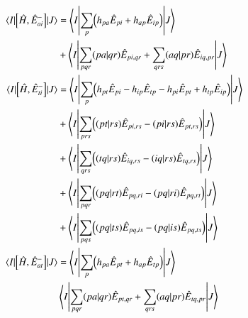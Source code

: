 \documentclass[aps,prb,reprint,showkeys,superscriptaddress]{revtex4-1}
\begin{document}
\begin{align}
  \label{eq:commHamExcOp}
\mel{I}{\comm{\hH}{\hE_{ai}^-}}{J} &= \mel**{I}{\sum_p \mleft(h_{pa}\hE_{pi} + h_{ap}\hE_{ip}\mright)}{J} \\
  &+ \mel**{I}{\sum_{pqr}\ceri{pa}{qr}\hE_{pi,qr} + \sum_{qrs}\ceri{aq}{pr}\hE_{iq,pr}}{J} \notag \\
  \mel{I}{\comm{\hH}{\hE_{ti}^-}}{J}&= \mel**{I}{\sum_p \mleft(h_{pt}\hE_{pi} - h_{ip}\hE_{tp} - h_{pi}\hE_{pt} + h_{tp}\hE_{ip}\mright)}{J} \notag \\
                                     &+ \mel**{I}{\sum_{prs}\mleft(\ceri{pt}{rs}\hE_{pi,rs} - \ceri{pi}{rs}\hE_{pt,rs} \mright)}{J} \notag \\
  &+ \mel**{I}{\sum_{qrs}\mleft(\ceri{tq}{rs}\hE_{iq,rs} - \ceri{iq}{rs}\hE_{tq,rs} \mright)}{J}   \\
                                     &+ \mel**{I}{\sum_{pqr}\mleft(\ceri{pq}{rt}\hE_{pq,ri} - \ceri{pq}{ri}\hE_{pq,rt} \mright)}{J} \notag \\
  &+ \mel**{I}{\sum_{pqs}\mleft(\ceri{pq}{ts}\hE_{pq,is} - \ceri{pq}{is}\hE_{pq,ts} \mright) }{J} \notag \\
  \mel{I}{\comm{\hH}{\hE_{at}^-}}{J} &= \mel**{I}{\sum_p \mleft(h_{pa}\hE_{pt} + h_{ap}\hE_{tp}\mright) }{J} \\
  & \mel**{I}{\sum_{pqr}\ceri{pa}{qr}\hE_{pt,qr} + \sum_{qrs}\ceri{aq}{pr}\hE_{tq,pr}}{J} \notag
\end{align}


\end{document}
